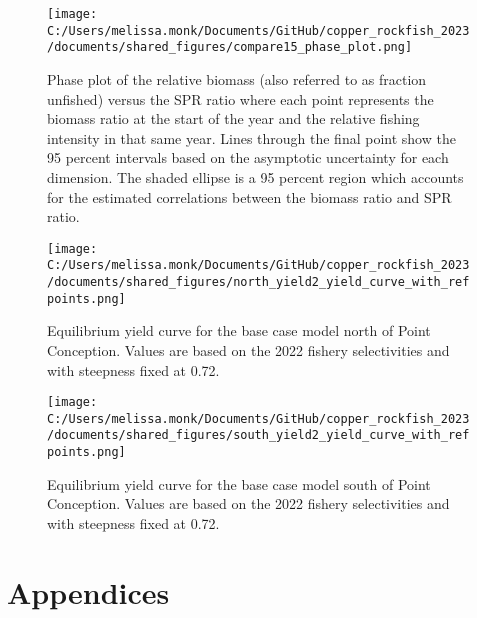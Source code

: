 \documentclass[11pt,
  letterpaper,
]{article}
\begin{document}
\clearpage

\begin{figure}
{\centering
\texttt{[image: C:/Users/melissa.monk/Documents/GitHub/copper\_rockfish\_2023/documents/shared\_figures/compare15\_phase\_plot.png]}
}
\caption{Phase plot of the relative biomass (also referred to as fraction unfished) versus the SPR ratio where each point represents the biomass ratio at the start of the year and the relative fishing intensity in that same year. Lines through the final point show the 95 percent intervals based on the asymptotic uncertainty for each dimension. The shaded ellipse is a 95 percent region which accounts for the estimated correlations between the biomass ratio and SPR ratio.\label{fig:phase}}
\end{figure}

\pagebreak

\begin{figure}
{\centering
\texttt{[image: C:/Users/melissa.monk/Documents/GitHub/copper\_rockfish\_2023/documents/shared\_figures/north\_yield2\_yield\_curve\_with\_refpoints.png]}
}
\caption{Equilibrium yield curve for the base case model north of Point Conception. Values are based on the 2022
fishery selectivities and with steepness fixed at 0.72.\label{fig:yield-north}}
\end{figure}

\pagebreak

\begin{figure}
{\centering
\texttt{[image: C:/Users/melissa.monk/Documents/GitHub/copper\_rockfish\_2023/documents/shared\_figures/south\_yield2\_yield\_curve\_with\_refpoints.png]}
}
\caption{Equilibrium yield curve for the base case model south of Point Conception. Values are based on the 2022
fishery selectivities and with steepness fixed at 0.72.\label{fig:yield-south}}
\end{figure}

\pagebreak

\section{Appendices}\label{appendices}
\end{document}
